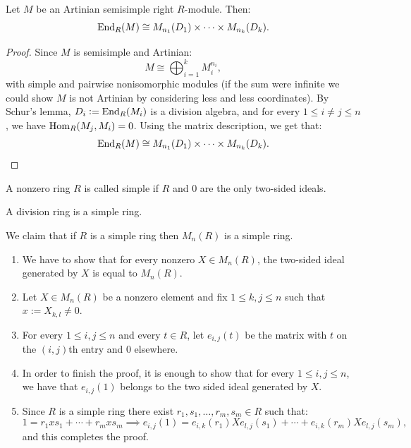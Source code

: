 \documentclass[11pt,a4paper]{article}
\begin{document}
\begin{corollary}
  Let $M$ be an Artinian semisimple right $R$-module.
  Then:
  \[
    \operatorname{End}_R(M) \cong
    M_{n_1}(D_1) \times \cdots \times M_{n_k}(D_k).
  \]
\end{corollary}
\begin{proof}
  Since $M$ is semisimple and Artinian:
  \[
    M \cong \bigoplus_{i=1}^{k} M_i^{n_i},
  \]
  with simple and pairwise nonisomorphic modules
  (if the sum were infinite we could show $M$ is not Artinian
  by considering less and less coordinates).
  By Schur's lemma, $D_i := \operatorname{End}_R(M_i)$ is a division algebra,
  and for every $1 \le i \neq j \le n$, we have $\operatorname{Hom}_R(M_j,M_i) = 0$.
  Using the matrix description, we get that:
  \[
    \operatorname{End}_R(M) \cong
    M_{n_1}(D_1) \times \cdots \times M_{n_k}(D_k).
  \]
\end{proof}

\begin{definition}
  A nonzero ring $R$ is called simple if $R$ and $0$ are the only two-sided
  ideals.
\end{definition}

\begin{example}
  A division ring is a simple ring.
\end{example}

\begin{example}
  We claim that if $R$ is a simple ring then $M_n(R)$ is a simple ring.
  \begin{enumerate}
    \item[(1)] We have to show that for every nonzero $X \in M_n(R)$,
      the two-sided ideal generated by $X$ is equal to $M_n(R)$.
    \item[(2)] Let $X \in M_n(R)$ be a nonzero element and fix $1 \le k,j \le n$
      such that $x := X_{k,l} \neq 0$.
    \item[(3)] For every $1 \le i,j \le n$ and every $t \in R$,
      let $e_{i,j}(t)$ be the matrix with $t$ on the $(i,j)$th entry
      and $0$ elsewhere.
    \item[(4)] In order to finish the proof,
      it is enough to show that for every $1 \le i, j \le n$,
      we have that $e_{i,j}(1)$ belongs to the two sided ideal generated by $X$.
    \item[(5)]
      Since $R$ is a simple ring there exist $r_1,s_1,\dots,r_m,s_m \in R$
      such that:
      \[
        1 = r_1 x s_1 + \cdots + r_m x s_m \implies
        e_{i,j}(1) =
        e_{i,k}(r_1) X e_{l,j}(s_1) + \cdots +
        e_{i,k}(r_m) X e_{l,j}(s_m),
      \]
      and this completes the proof.
  \end{enumerate}
\end{example}
\end{document}
